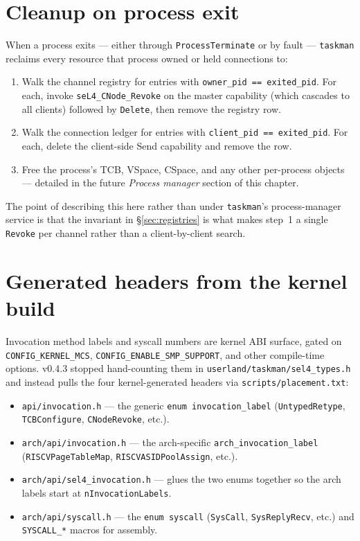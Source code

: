 \section{Cleanup on process exit}
\label{sec:exit-cleanup}

When a process exits --- either through \texttt{ProcessTerminate} or by
fault --- \texttt{taskman} reclaims every resource that process owned
or held connections to:

\begin{enumerate}
    \item Walk the channel registry for entries with
          \texttt{owner\_pid == exited\_pid}.  For each, invoke
          \texttt{seL4\_CNode\_Revoke} on the master capability (which
          cascades to all clients) followed by \texttt{Delete}, then
          remove the registry row.
    \item Walk the connection ledger for entries with
          \texttt{client\_pid == exited\_pid}.  For each, delete the
          client-side Send capability and remove the row.
    \item Free the process's TCB, VSpace, CSpace, and any other
          per-process objects --- detailed in the future \emph{Process
          manager} section of this chapter.
\end{enumerate}

The point of describing this here rather than under \texttt{taskman}'s
process-manager service is that the invariant in \S\ref{sec:registries}
is what makes step~1 a single \texttt{Revoke} per channel rather than a
client-by-client search.

\section{Generated headers from the kernel build}

Invocation method labels and syscall numbers are kernel ABI surface,
gated on \texttt{CONFIG\_KERNEL\_MCS}, \texttt{CONFIG\_ENABLE\_SMP\_SUPPORT},
and other compile-time options.  v0.4.3 stopped hand-counting them in
\texttt{userland/taskman/sel4\_types.h} and instead pulls the four
kernel-generated headers via \texttt{scripts/placement.txt}:

\begin{itemize}
    \item \texttt{api/invocation.h} --- the generic
          \texttt{enum invocation\_label} (\texttt{UntypedRetype},
          \texttt{TCBConfigure}, \texttt{CNodeRevoke}, etc.).
    \item \texttt{arch/api/invocation.h} --- the arch-specific
          \texttt{arch\_invocation\_label} (\texttt{RISCVPageTableMap},
          \texttt{RISCVASIDPoolAssign}, etc.).
    \item \texttt{arch/api/sel4\_invocation.h} --- glues the two
          enums together so the arch labels start at
          \texttt{nInvocationLabels}.
    \item \texttt{arch/api/syscall.h} --- the
          \texttt{enum syscall} (\texttt{SysCall}, \texttt{SysReplyRecv},
          etc.) and \texttt{SYSCALL\_*} macros for assembly.
\end{itemize}

